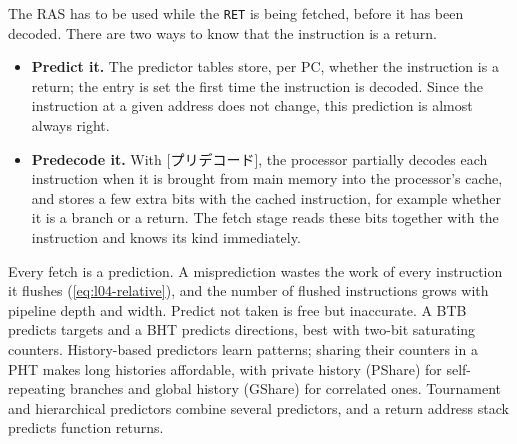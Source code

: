 \documentclass[../main.tex]{subfiles}
\begin{document}
The RAS has to be used while the \texttt{RET} is being fetched, before it has
been decoded.  There are two ways to know that the instruction is a return.
\begin{itemize}
  \item \textbf{Predict it.}  The predictor tables store, per PC, whether the
    instruction is a return; the entry is set the first time the instruction
    is decoded.  Since the instruction at a given address does not change,
    this prediction is almost always right.
  \item \textbf{Predecode it.}  With [プリデコード], the
    processor partially decodes each instruction when it is brought from
    main memory into the processor's cache, and stores a few extra bits with
    the cached instruction, for example whether it is a branch or a return.  The fetch
    stage reads these bits together with the instruction and knows its kind
    immediately.
\end{itemize}

\begin{keypoint}
  Every fetch is a prediction.  A misprediction wastes the work of every
  instruction it flushes (\cref{eq:l04-relative}), and the number of flushed
  instructions grows with pipeline depth and width.  Predict not taken is
  free but inaccurate.  A BTB predicts
  targets and a BHT predicts directions, best with two-bit saturating
  counters.  History-based predictors learn patterns; sharing their counters
  in a PHT makes long histories affordable, with private history (PShare)
  for self-repeating branches and global history (GShare) for correlated
  ones.  Tournament and hierarchical predictors combine several predictors,
  and a return address stack predicts function returns.
\end{keypoint}
\end{document}

